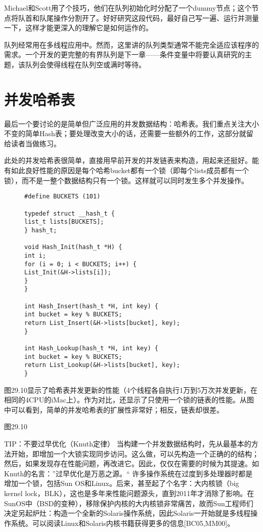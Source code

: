 Michael和Scott用了个技巧，他们在队列初始化时分配了一个dummy节点；这个节点将队首和队尾操作分割开了。好好研究这段代码，最好自己写一遍、运行并测量一下，这样才能更深入的理解它是如何运作的。

队列经常用在多线程应用中。然而，这里讲的队列类型通常不能完全适应该程序的需求。一个开发的更完整的有界队列是下一章——条件变量中将要认真研究的主题，该队列会使得线程在队列空或满时等待。


\section{并发哈希表}
最后一个要讨论的是简单但广泛应用的并发数据结构：哈希表。我们重点关注大小不变的简单Hash表；要处理改变大小的话，还需要一些额外的工作，这部分就留给读者当做练习。

此处的并发哈希表很简单，直接用早前开发的并发链表来构造，用起来还挺好。能有如此良好性能的原因是每个哈希bucket都有一个锁（即每个lists成员都有一个锁），而不是一整个数据结构只有一个锁。这样就可以同时发生多个并发操作。

\begin{figure}[h]
\begin{lstlisting}
#define BUCKETS (101)

typedef struct __hash_t {
list_t lists[BUCKETS];
} hash_t;

void Hash_Init(hash_t *H) {
int i;
for (i = 0; i < BUCKETS; i++) {
List_Init(&H->lists[i]);
}
}

int Hash_Insert(hash_t *H, int key) {
int bucket = key % BUCKETS;
return List_Insert(&H->lists[bucket], key);
}

int Hash_Lookup(hash_t *H, int key) {
int bucket = key % BUCKETS;
return List_Lookup(&H->lists[bucket], key);
}
\end{lstlisting}
\caption{}
\end{figure}

图29.10显示了哈希表并发更新的性能（4个线程各自执行1万到5万次并发更新，在相同的4CPU的iMac上）。作为对比，还显示了只使用一个锁的链表的性能。从图中可以看到，简单的并发哈希表的扩展性非常好；相反，链表却很差。

\begin{figure}[h]

\caption{}
\end{figure}
图29.10

TIP：不要过早优化（Knuth定律）
当构建一个并发数据结构时，先从最基本的方法开始，即增加一个大锁实现同步访问。这么做，可以先构造一个正确的的结构；然后，如果发现存在性能问题，再改进它。因此，仅仅在需要的时候为其提速。如Knuth的名言：”过早优化是万恶之源。“
许多操作系统在过度到多处理器时都是增加一个锁，包括Sun OS和Linux。后来，甚至起了个名字：大内核锁（big kernel lock，BLK），这也是多年来性能问题源头，直到2011年才消除了影响。在SunOS中（BSD的变种），移除保护内核的大内核锁非常痛苦，故而Sun工程师们决定另起炉灶：构造一个全新的Solaris操作系统，因此Solaris一开始就是多线程操作系统。可以阅读Linux和Solaris内核书籍获得更多的信息[BC05,MM00]。


